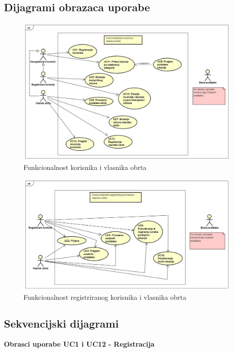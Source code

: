 	\subsection*{Dijagrami obrazaca uporabe}
    	\begin{figure}[H]
            \centering                \includegraphics[width=\textwidth]{img/UseCaseDiagram1.png}
            \caption{Funkcionalnost korisnika i vlasnika obrta}
        \end{figure}
		\begin{figure}[H]
			\centering
			\includegraphics[width=\textwidth]{img/UseCaseDiagram2.png}
			\caption{Funkcionalnost registriranog korisnika i vlasnika obrta}
			    \end{figure}

    \subsection{Sekvencijski dijagrami}
		\textbf{Obrasci uporabe UC1 i UC12 - Registracija}
				

